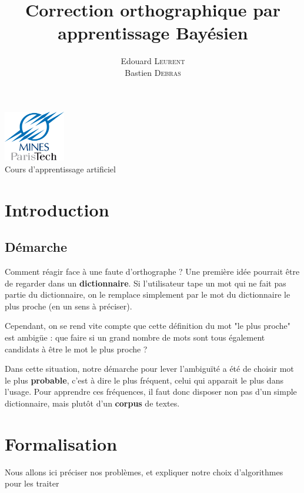 \documentclass[10pt,a4paper]{article}
\title{Correction orthographique par apprentissage Bayésien}
\author{Edouard \textsc{Leurent} \\ Bastien \textsc{Debras}}
\begin{document}
\maketitle
{}
\begin{center}
\includegraphics[width=0.2\textwidth]{logo_mines}\\ 
\vspace{1cm}
\Large{Cours d'apprentissage artificiel}
\end{center}
\tableofcontents
\vspace{5cm}

\newpage

\section{Introduction}
\subsection{Démarche}
Comment réagir face à une faute d'orthographe ? Une première idée pourrait être de regarder dans un \textbf{dictionnaire}. Si l'utilisateur tape un mot qui ne fait pas partie du dictionnaire, on le remplace simplement par le mot du dictionnaire le plus proche (en un sens à préciser). 

Cependant, on se rend vite compte que cette définition du mot "le plus proche" est ambigüe : que faire si un grand nombre de mots sont tous également candidats à être le mot le plus proche ?

Dans cette situation, notre démarche pour lever l'ambiguïté a été de choisir mot le plus \textbf{probable}, c'est à dire le plus fréquent, celui qui apparait le plus dans l'usage. Pour apprendre ces fréquences, il faut donc disposer non pas d'un simple dictionnaire, mais plutôt d'un \textbf{corpus} de textes.

\section{Formalisation}

Nous allons ici préciser nos problèmes, et expliquer notre choix d'algorithmes pour les traiter
\end{document}
